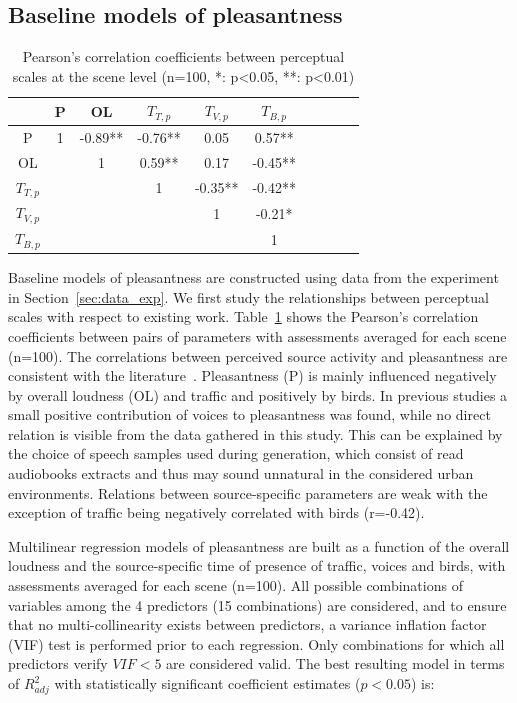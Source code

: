 \documentclass[twocolumn]{article}
\begin{document}
\subsection{Baseline models of pleasantness}
\label{sec:app_mdls}

\begin{table}[t]
\centering
\caption{Pearson's correlation coefficients between perceptual scales at the scene level (n=100, *: p<0.05, **: p<0.01)}
\label{tab:percc}
\begin{tabular}{ c | c c c c c c c c c }
\hline
	 & P & OL & $T_{T, p}$ & $T_{V, p}$ & $T_{B, p}$ \\ \hline
	P & 1 & -0.89** & -0.76** & 0.05 & 0.57** \\
	OL &  & 1 & 0.59** & 0.17 & -0.45** \\
	$T_{T, p}$ &  &  & 1 & -0.35** & -0.42** \\
	$T_{V, p}$ &  &  &  & 1 & -0.21* \\
	$T_{B, p}$ &  &  &  &  & 1 \\ \hline
\end{tabular}
\end{table}

Baseline models of pleasantness are constructed using data from the experiment in Section~\ref{sec:data_exp}. We first study the relationships between perceptual scales with respect to existing work. Table~\ref{tab:percc} shows the Pearson's correlation coefficients between pairs of parameters with assessments averaged for each scene (n=100). The correlations between perceived source activity and pleasantness are consistent with the literature~\cite{aumond2017, gontier2018}. Pleasantness (P) is mainly influenced negatively by overall loudness (OL) and traffic and positively by birds. In previous studies a small positive contribution of voices to pleasantness was found, while no direct relation is visible from the data gathered in this study. This can be explained by the choice of speech samples used during generation, which consist of read audiobooks extracts and thus may sound unnatural in the considered urban environments. Relations between source-specific parameters are weak with the exception of traffic being negatively correlated with birds (r=-0.42).

Multilinear regression models of pleasantness are built as a function of the overall loudness and the source-specific time of presence of traffic, voices and birds, with assessments averaged for each scene (n=100). All possible combinations of variables among the 4 predictors (15 combinations) are considered, and to ensure that no multi-collinearity exists between predictors, a variance inflation factor (VIF) test is performed prior to each regression. Only combinations for which all predictors verify $VIF<5$ are considered valid. The best resulting model in terms of $R^2_{adj}$ with statistically significant coefficient estimates ($p<0.05$) is:
\end{document}
